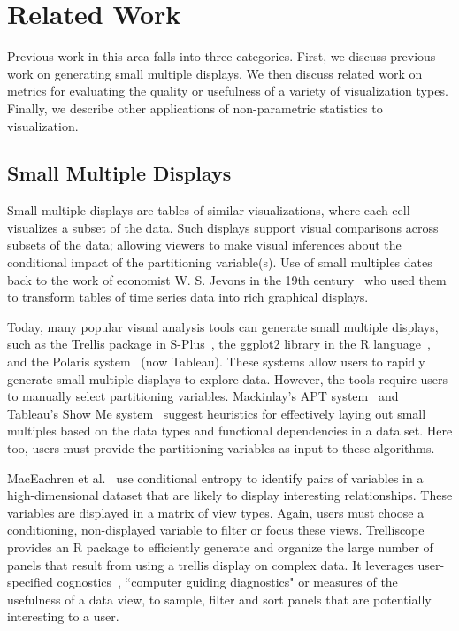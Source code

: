 \section{Related Work}
\label{sec:related}
Previous work in this area falls into three categories. First, we discuss previous work on generating small multiple displays. We then discuss related work on metrics for evaluating the quality or usefulness of a variety of visualization types. Finally, we describe other applications of non-parametric statistics to visualization.

\subsection{Small Multiple Displays}
Small multiple displays are tables of similar visualizations, where each cell visualizes a subset of the data. Such displays support visual comparisons across subsets of the data; allowing viewers to make visual inferences about the conditional impact of the partitioning variable(s). Use of small multiples dates back to the work of economist W. S. Jevons in the 19th century~\cite{Kelley1973} who used them to transform tables of time series data into rich graphical displays. 

Today, many popular visual analysis tools can generate small multiple displays, such as the Trellis package in S-Plus~\cite{Becker1996-manual}, the ggplot2 library in the R language~\cite{Wickham2006}, and the Polaris system~\cite{Stolte2002} (now Tableau). These systems allow users to rapidly generate small multiple displays to explore data. However, the tools require users to manually select partitioning variables. Mackinlay's APT system~\cite{mackinlay1986} and Tableau's Show Me system~\cite{mackinlay2007} suggest heuristics for effectively laying out small multiples based on the data types and functional dependencies in a data set. Here too, users must provide the partitioning variables as input to these algorithms. 

MacEachren et al.~\cite{Maceachren2003} use conditional entropy to identify pairs of variables in a high-dimensional dataset that are likely to display interesting relationships. These variables are displayed in a matrix of view types. Again, users must choose a conditioning, non-displayed variable to filter or focus these views. Trelliscope~\cite{Hafen2013} provides an R package to efficiently generate and organize the large number of panels that result from using a trellis display on complex data. It leverages user-specified cognostics~\cite{Tukey1982,Tukey1985}, ``computer guiding diagnostics" or measures of the usefulness of a data view, to sample, filter and sort panels that are potentially interesting to a user. 

